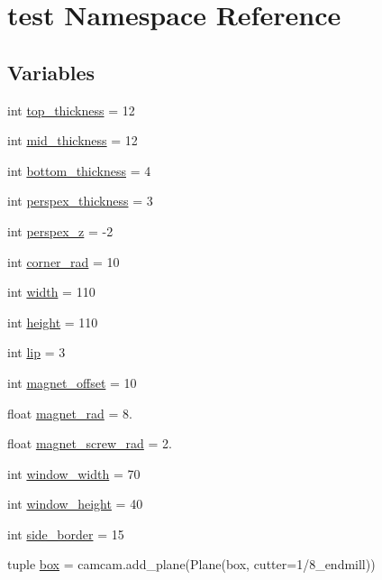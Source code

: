 \hypertarget{namespacetest}{}\section{test Namespace Reference}
\label{namespacetest}
\subsection*{Variables}
\begin{DoxyCompactItemize}
\item 
int \hyperlink{namespacetest_a1f1f1b6d0fb7ae6cb8e0d7a823825e8d}{top\+\_\+thickness} = 12
\item 
int \hyperlink{namespacetest_a5e58b0c7b4760f790f0c6d5e162fda87}{mid\+\_\+thickness} = 12
\item 
int \hyperlink{namespacetest_a10f54c7f8dd77a534e788bf487ff2b1a}{bottom\+\_\+thickness} = 4
\item 
int \hyperlink{namespacetest_aee352ece5b82d2a5c33a4ddc45c5c990}{perspex\+\_\+thickness} = 3
\item 
int \hyperlink{namespacetest_a62e0147a9d690a7a90d3beca23dcb944}{perspex\+\_\+z} = -\/2
\item 
int \hyperlink{namespacetest_a0f7c1b1c2817d5785aa0407879366227}{corner\+\_\+rad} = 10
\item 
int \hyperlink{namespacetest_a064937db856e36c5389241650eb91307}{width} = 110
\item 
int \hyperlink{namespacetest_a0981d504d028598d82644c006c420453}{height} = 110
\item 
int \hyperlink{namespacetest_a41fbb9ae9b5a863e7e882fc1ca2daa8a}{lip} = 3
\item 
int \hyperlink{namespacetest_a08f26fee2fec02db82eb7b6dc5c1aaa5}{magnet\+\_\+offset} = 10
\item 
float \hyperlink{namespacetest_ab757d0228bdd92d6efdc4b6f0ec34e81}{magnet\+\_\+rad} = 8.
\item 
float \hyperlink{namespacetest_a9cf4c1f11ba8ff11dc2b8331dfa18f1f}{magnet\+\_\+screw\+\_\+rad} = 2.
\item 
int \hyperlink{namespacetest_a0abc4c703668de72c997fe9992c42fe8}{window\+\_\+width} = 70
\item 
int \hyperlink{namespacetest_a0d14ff24adddf44ef52460812fb711a4}{window\+\_\+height} = 40
\item 
int \hyperlink{namespacetest_ad2fa754f668be8d566b49d2b75c14320}{side\+\_\+border} = 15
\item 
tuple \hyperlink{namespacetest_a216fdd5fd8b05a73731fd5eadfc278dc}{box} = camcam.\+add\+\_\+plane(Plane(\textquotesingle{}box\textquotesingle{}, cutter=\textquotesingle{}1/8\+\_\+endmill\textquotesingle{}))

\end{DoxyCompactItemize}
